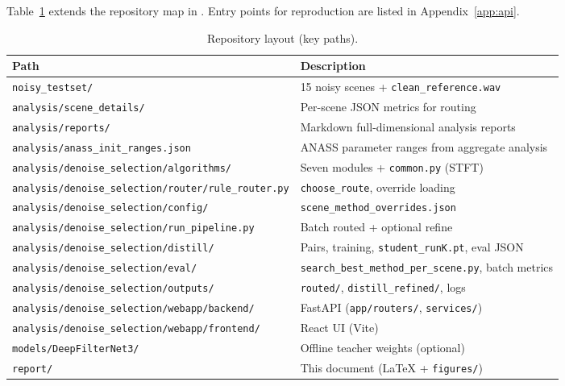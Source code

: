 Table~\ref{tab:repo_layout_app} extends the repository map in . Entry points for reproduction are listed in Appendix~\ref{app:api}.

\begin{table}[H]
  \centering
  \caption{Repository layout (key paths).}
  \label{tab:repo_layout_app}
  \footnotesize
  \begin{tabularx}{\textwidth}{l X}
    \toprule
    \textbf{Path} & \textbf{Description} \\
    \midrule
    \texttt{noisy\_testset/} & 15 noisy scenes + \texttt{clean\_reference.wav} \\
    \texttt{analysis/scene\_details/} & Per-scene JSON metrics for routing \\
    \texttt{analysis/reports/} & Markdown full-dimensional analysis reports \\
    \texttt{analysis/anass\_init\_ranges.json} & ANASS parameter ranges from aggregate analysis \\
    \texttt{analysis/denoise\_selection/algorithms/} & Seven modules + \texttt{common.py} (STFT) \\
    \texttt{analysis/denoise\_selection/router/rule\_router.py} & \texttt{choose\_route}, override loading \\
    \texttt{analysis/denoise\_selection/config/} & \texttt{scene\_method\_overrides.json} \\
    \texttt{analysis/denoise\_selection/run\_pipeline.py} & Batch routed + optional refine \\
    \texttt{analysis/denoise\_selection/distill/} & Pairs, training, \texttt{student\_runK.pt}, eval JSON \\
    \texttt{analysis/denoise\_selection/eval/} & \texttt{search\_best\_method\_per\_scene.py}, batch metrics \\
    \texttt{analysis/denoise\_selection/outputs/} & \texttt{routed/}, \texttt{distill\_refined/}, logs \\
    \texttt{analysis/denoise\_selection/webapp/backend/} & FastAPI (\texttt{app/routers/}, \texttt{services/}) \\
    \texttt{analysis/denoise\_selection/webapp/frontend/} & React UI (Vite) \\
    \texttt{models/DeepFilterNet3/} & Offline teacher weights (optional) \\
    \texttt{report/} & This document (\LaTeX{} + \texttt{figures/}) \\
    \bottomrule
  \end{tabularx}
\end{table}


